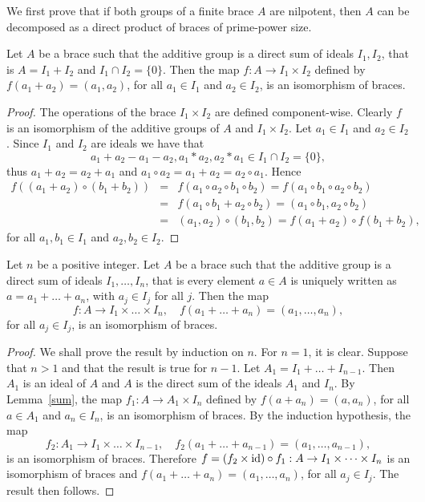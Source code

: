 We first prove that if both groups of a finite brace $A$ are
nilpotent, then $A$ can be decomposed as a direct product of braces
of prime-power size. 

\begin{lemma}
\label{sum}
    Let $A$ be a brace such that the additive
group is a direct sum of ideals $I_1,I_2$, that is $A=I_1+I_2$ and
$I_1\cap I_2=\{0\}$. Then the map $f:A\rightarrow I_1\times I_2$
defined by $f(a_1+a_2)=(a_1,a_2)$, for all $a_1\in I_1$ and $a_2\in
I_2$, is an isomorphism of braces.
\end{lemma}

\begin{proof}
The operations of the brace $I_1\times I_2$
are defined component-wise. Clearly $f$ is an isomorphism of the
additive groups of $A$ and $I_1\times I_2$. Let $a_1\in I_1$ and
$a_2\in I_2$. Since $I_1$ and $I_2$ are ideals we have that
$$a_1+a_2-a_1-a_2, a_1*a_2, a_2*a_1\in I_1\cap I_2=\{ 0\},$$
thus $a_1+a_2=a_2+a_1$ and $a_1\circ a_2=a_1+a_2=a_2\circ a_1$.
Hence
\begin{eqnarray*} f((a_1+a_2)\circ (b_1+b_2))&=&f(a_1\circ
a_2\circ b_1\circ b_2)=
f(a_1\circ b_1\circ a_2\circ b_2)\\
&=&f(a_1\circ b_1 + a_2\circ b_2)=(a_1\circ b_1 , a_2\circ b_2)\\
&=&(a_1,a_2)\circ (b_1,b_2)=f(a_1+a_2)\circ f(b_1 +b_2),
\end{eqnarray*}
for all $a_1,b_1\in I_1$ and $a_2,b_2\in I_2$. 
\end{proof}

\begin{theorem}
    \label{thm:direct}
    Let $n$ be a positive integer. Let $A$ be a brace such that the additive
group is a direct sum of ideals $I_1,\dots ,I_n$, that is every
element $a\in A$ is uniquely written as $a=a_1+\dots +a_n$, with
$a_j\in I_j$ for all $j$. Then the map \[
f:A\rightarrow
I_1\times\dots\times I_n,
\quad
f(a_1+\dots +a_n)=(a_1,\dots
,a_n),
\]
for all $a_j\in I_j$, is an isomorphism of braces.
\end{theorem}

\begin{proof}
We shall prove the result by induction on $n$. For $n=1$, it is
clear. Suppose that $n>1$ and that the result is true for $n-1$. Let
$A_1=I_1+\dots +I_{n-1}$. Then $A_1$ is an ideal of $A$ and $A$ is
the direct sum of the ideals $A_1$ and $I_n$. By Lemma~\ref{sum},
the map $f_1: A\rightarrow A_1\times I_n$ defined by
$f(a+a_n)=(a,a_n)$, for all $a\in A_1$ and $a_n\in I_n$, is an
isomorphism of braces. By the induction hypothesis, the
map
\[
    f_2:A_1\rightarrow I_1\times \dots\times I_{n-1},
    \quad
    f_2(a_1+\dots +a_{n-1})=(a_1,\dots ,a_{n-1}),
\]
is an isomorphism of braces. Therefore $f=(f_2\times
\operatorname{id})\circ f_1:A\rightarrow I_1\times\dots\times I_n$ is an
isomorphism of braces and $f(a_1+\dots +a_n)=(a_1,\dots
,a_n)$, for all $a_j\in I_j$. The result then follows.
\end{proof}

